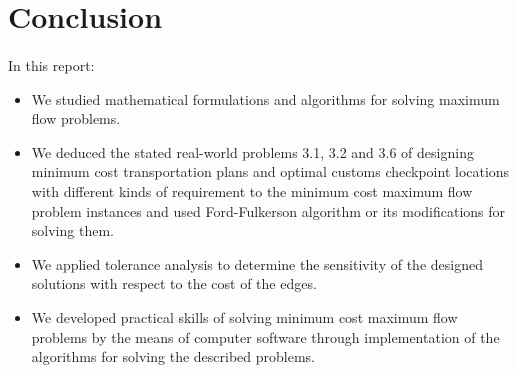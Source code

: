 \section{Conclusion}
	\paragraph{}
	In this report:
\begin{itemize}
	\item We studied mathematical formulations and algorithms for solving maximum flow problems.
	\item We deduced the stated real-world problems 3.1, 3.2 and 3.6 of designing minimum cost transportation plans and optimal customs checkpoint locations with different kinds of requirement to the minimum cost maximum flow problem instances and used Ford-Fulkerson algorithm or its modifications for solving them.
	\item We applied tolerance analysis to determine the sensitivity of the designed solutions with respect to the cost of the edges.
	\item We developed practical skills of solving minimum cost maximum flow problems by the means of computer software through implementation of the algorithms for solving the described problems.
\end{itemize}
